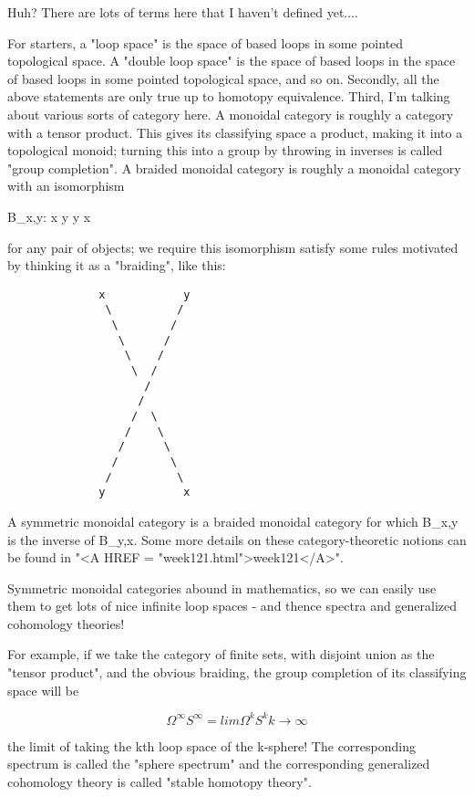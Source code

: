 Huh?  There are lots of terms here that I haven't defined yet....

For starters, a "loop space" is the space of based loops in some
pointed topological space.  A "double loop space" is the space of
based loops in the space of based loops in some pointed topological
space, and so on.  Secondly, all the above statements are only true up
to homotopy equivalence.  Third, I'm talking about various sorts of
category here.  A monoidal category is roughly a category with a
tensor product.  This gives its classifying space a product, making it
into a topological monoid; turning this into a group by throwing in
inverses is called "group completion".  A braided monoidal category is
roughly a monoidal category with an isomorphism

B_{x,y}: x \otimes  y \to  y \otimes  x

for any pair of objects; we require this isomorphism satisfy some rules 
motivated by thinking it as a "braiding", like this:

\begin{verbatim}
              x            y
               \          /
                \        /
                 \      /
                  \    /
                   \  /
                     /
                    /
                   /  \
                  /    \
                 /      \
                /        \
               /          \
              y            x
\end{verbatim}
    
A symmetric monoidal category is a braided monoidal category for which
B_{x,y} is the inverse of B_{y,x}.  Some more details
on these category-theoretic notions can be found in "<A HREF =
"week121.html">week121</A>".

Symmetric monoidal categories abound in mathematics, so we can easily use 
them to get lots of nice infinite loop spaces - and thence spectra and 
generalized cohomology theories!

For example, if we take the category of finite sets, with disjoint
union as the "tensor product", and the obvious braiding, 
the group completion of its classifying space will be

$$
\Omega ^{\infty } S^{\infty }  =  lim  \Omega ^{k} S^{k}
         k \to  \infty 
$$
    

the limit of taking the kth loop space of the k-sphere!  The
corresponding spectrum is called the "sphere spectrum" and
the corresponding generalized cohomology theory is called "stable
homotopy theory".

